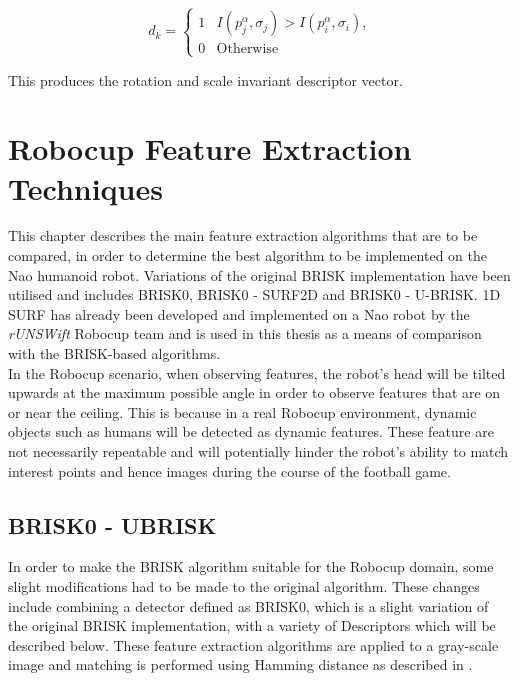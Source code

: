 \documentclass[11pt]{report}
\begin{document}
\begin{equation}
d_k = \left\{ \begin{array}{rl}
1 &\mbox{$I(p_j^{\alpha}, \sigma_j) > I(p_i^{\alpha}, \sigma_i)$,} \\
0 &\mbox{Otherwise}
\end{array} \right.
\label{eqn:brightness}
\end{equation}

This produces the rotation and scale invariant descriptor vector.\\


\chapter{Robocup Feature Extraction Techniques}
\label{sec:realtimeFeatureExtraction}
This chapter describes the main feature extraction algorithms that are to be compared, in order to determine the best algorithm to be implemented on the Nao humanoid robot. Variations of the original BRISK implementation \cite{Leutenegger2011} have been utilised and includes BRISK0, BRISK0 - SURF2D and BRISK0 - U-BRISK. 1D SURF has already been developed and implemented on a Nao robot by the \textit{rUNSWift} Robocup team \cite{Anderson} and is used in this thesis as a means of comparison with the BRISK-based algorithms.\\

In the Robocup scenario, when observing features, the robot's head will be tilted upwards at the maximum possible angle in order to observe features that are on or near the ceiling. This is because in a real Robocup environment, dynamic objects such as humans will be detected as dynamic features. These feature are not necessarily repeatable and will potentially hinder the robot's  ability to match interest points and hence images during the course of the football game.\\

\section{BRISK0 - UBRISK}
\label{sec:brisk0}
In order to make the BRISK algorithm suitable for the Robocup domain, some slight modifications had to be made to the original algorithm. These changes include combining a detector defined as BRISK0, which is a slight variation of the original BRISK implementation, with a variety of Descriptors which will be described below. These feature extraction algorithms are applied to a gray-scale image and matching is performed using Hamming distance as described in .\\
\end{document}

